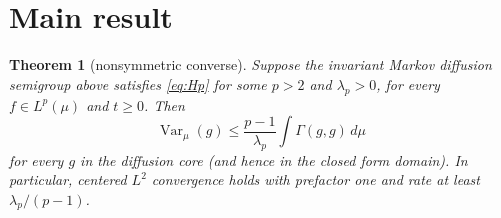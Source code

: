 \documentclass[11pt]{article}
\newtheorem{theorem}{Theorem}
\newcommand{\Var}{\operatorname{Var}_{\mu}}
\begin{document}
\section*{Main result}

\begin{theorem}[nonsymmetric converse]\label{thm:main}
Suppose the invariant Markov diffusion semigroup above satisfies
\eqref{eq:Hp} for some $p>2$ and $\lambda_p>0$, for every $f\in L^p(\mu)$
and $t\ge0$.  Then
\begin{equation}\label{eq:poincare}
 \Var(g)\le \frac{p-1}{\lambda_p}
       \int\Gamma(g,g)\,d\mu
\end{equation}
for every $g$ in the diffusion core (and hence in the closed form domain).
In particular, centered $L^2$ convergence holds with prefactor one and rate
at least $\lambda_p/(p-1)$.
\end{theorem}
\end{document}
